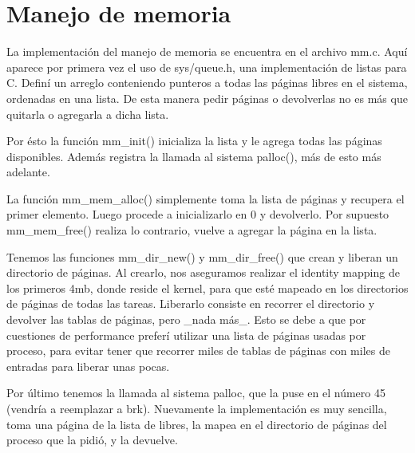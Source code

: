 \section{Manejo de memoria}

La implementación del manejo de memoria se encuentra en el archivo mm.c. Aquí
aparece por primera vez el uso de sys/queue.h, una implementación de listas
para C. Definí un arreglo conteniendo punteros a todas las páginas libres en el
sistema, ordenadas en una lista. De esta manera pedir páginas o devolverlas no
es más que quitarla o agregarla a dicha lista.

Por ésto la función mm\_init() inicializa la lista y le agrega todas las
páginas disponibles. Además registra la llamada al sistema palloc(), más de
esto más adelante.

La función mm\_mem\_alloc() simplemente toma la lista de páginas y recupera
el primer elemento. Luego procede a inicializarlo en 0 y devolverlo. Por
supuesto mm\_mem\_free() realiza lo contrario, vuelve a agregar la página en la
lista.

Tenemos las funciones mm\_dir\_new() y mm\_dir\_free() que crean y liberan
un directorio de páginas. Al crearlo, nos aseguramos realizar el identity
mapping de los primeros 4mb, donde reside el kernel, para que esté mapeado en
los directorios de páginas de todas las tareas. Liberarlo consiste en recorrer
el directorio y devolver las tablas de páginas, pero \_nada más\_. Esto se debe
a que por cuestiones de performance preferí utilizar una lista de páginas
usadas por proceso, para evitar tener que recorrer miles de tablas de páginas
con miles de entradas para liberar unas pocas.

Por último tenemos la llamada al sistema palloc, que la puse en el número 45
(vendría a reemplazar a brk). Nuevamente la implementación es muy sencilla,
toma una página de la lista de libres, la mapea en el directorio de páginas del
proceso que la pidió, y la devuelve.
